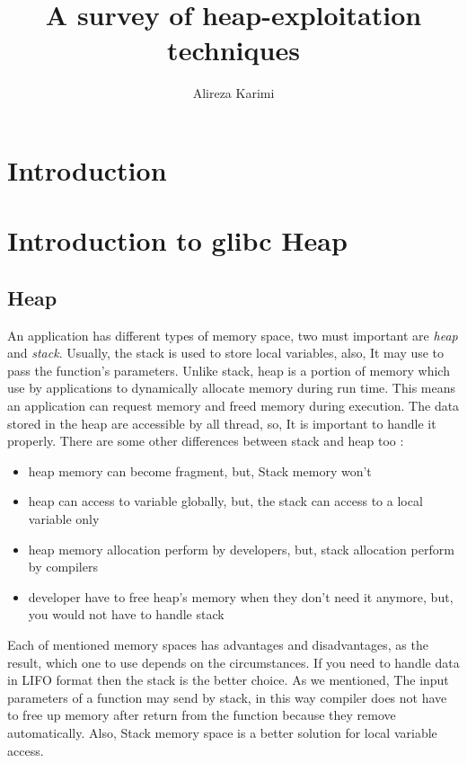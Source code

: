 \documentclass{masterthesis}
\newcommand*\libc{glibc}
\begin{document}
\title{A survey of heap-exploitation techniques}

\author{Alireza Karimi}



\maketitle

\tableofcontents

\chapter{Introduction}

\chapter{Introduction to \libc{} Heap}

\section{Heap}

An application has different types of memory space, two must important are \emph{heap} and \emph{stack}. Usually, the stack is used to store local variables, also, It may use to pass the function's parameters. Unlike stack, heap is a portion of memory which use by applications to dynamically allocate memory during run time. This means an application can request memory and freed memory during execution. The data stored in the heap are accessible by all thread, so, It is important to handle it properly. There are some other differences between stack and heap too :
\begin{itemize}
	\item heap memory can become fragment, but, Stack memory won't
	\item heap can access to variable globally, but, the stack can access to a local variable only
	\item heap memory allocation perform by developers, but, stack allocation perform by compilers
	\item developer have to free heap's memory when they don't need it anymore, but, you would not have to handle stack
\end{itemize}
Each of mentioned memory spaces has advantages and disadvantages, as the result, which one to use depends on the circumstances. If you need to handle data in LIFO format then the stack is the better choice. As we mentioned, The input parameters of a function may send by stack, in this way compiler does not have to free up memory after return from the function because they remove automatically. Also, Stack memory space is a better solution for local variable access.
\end{document}
